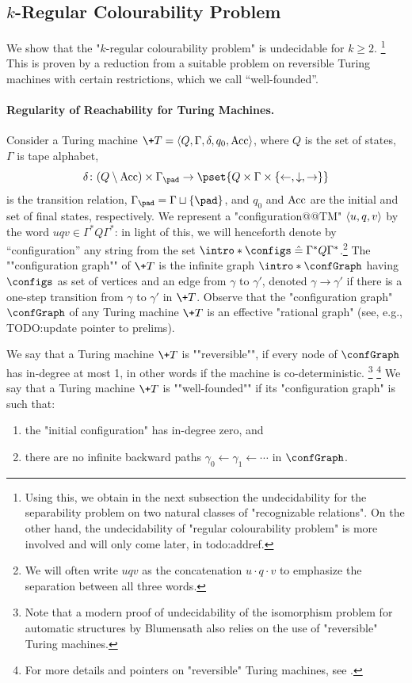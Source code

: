 \subsection{$k$-Regular Colourability Problem}

We show that the "$k$-regular colourability problem" is undecidable for $k\geq 2$.%
\footnote{
    Using this, we obtain in the next subsection 
    the undecidability for the separability problem on two natural classes of 
    "recognizable relations".
    On the other hand, the undecidability of "regular colourability problem" is more involved and will only come later, in todo:addref.
}
This is proven by a reduction from a suitable problem on reversible 
Turing machines with certain restrictions, which we call ``well-founded''.

\paragraph*{Regularity of Reachability for Turing Machines.}
Consider a Turing machine $\+T = \tup{Q,\Gamma,\delta,q_0,\Acc}$, where $Q$ is the set of states, $\Gamma$ is tape alphabet,
\[
    \delta\colon (Q \setminus \Acc) \times \Gamma_{\pad} \to \pset{Q \times \Gamma \times \set{\leftarrow, \downarrow, \rightarrow}}
\]
is the transition relation, $\Gamma_{\pad} = \Gamma \dcup \set{\pad}$, and $q_0$ and $\textrm{Acc}$ are the initial and set of final states, respectively.
%
We represent a "configuration@@TM" $\langle u, q, v\rangle$ by the word $uqv \in \Gamma^* Q \Gamma^*$:
in light of this, we will henceforth denote by ``configuration'' any string from the set  \AP$\intro*\configs \defeq  \Gamma^* Q \Gamma^*$.\footnote{We will often write
$uqv$ as the concatenation $u\cdot q \cdot v$ to emphasize
the separation between all three words.}
The \AP""configuration graph"" of $\+T$ is the infinite graph $\intro*\confGraph$ having $\configs$ as set of vertices and an edge from $\gamma$ to $\gamma'$, denoted $\gamma \rightarrow \gamma'$ if there is a one-step transition from $\gamma$ to $\gamma'$ in $\+T$. Observe that the "configuration graph" $\confGraph$ of any Turing machine $\+T$ is an effective "rational graph" (see, e.g., \cite{KuskeLohrey2010AutomaticGraphs} TODO:update pointer to prelims).

\AP We say that a Turing machine $\+T$ is ""reversible"", if every node of $\confGraph$ has in-degree at most 1, in other words if the machine is co-deterministic.%
\footnote{
    Note that a modern proof of undecidability of the isomorphism problem for automatic structures 
    by Blumensath \cite[\S VIII. Theorem 4.3, p. 396 \& second claim, p. 398]{Blumensath2023MSO} 
    also relies on the use of "reversible" Turing machines.
}%
\footnote{
    For more details and pointers on "reversible" Turing machines,
    see \cite[Chapter 5]{Morita2017Reversible}.
}
We say that a Turing machine $\+T$ is ""well-founded"" if its "configuration graph" is such that:
\begin{enumerate}
    \item the "initial configuration" has in-degree zero, and
    \item there are no infinite backward paths $\gamma_0 \leftarrow \gamma_1 \leftarrow \cdots$ in $\confGraph$. 
\end{enumerate}

